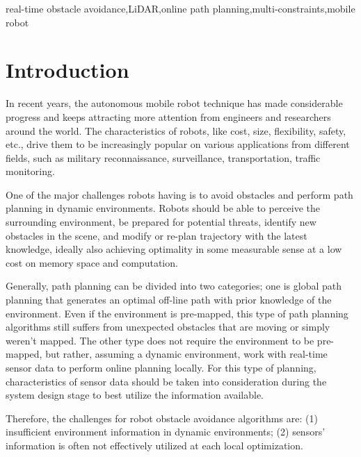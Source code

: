\documentclass{iosart2c}
\begin{document}
\begin{frontmatter}
\begin{keyword}
real-time obstacle avoidance\sep LiDAR\sep online path planning\sep multi-constraints\sep mobile robot
\end{keyword}

\end{frontmatter}



\section{Introduction}\label{s1}
In recent years, the autonomous mobile robot technique has made considerable progress and keeps attracting more attention from engineers and researchers around the world. The characteristics of robots, like cost, size, flexibility, safety, etc., drive them to be increasingly popular on various applications from different fields, such as military reconnaissance, surveillance, transportation, traffic monitoring\cite{1,2}. 

One of the major challenges robots having is to avoid obstacles and perform path planning in dynamic environments. Robots should be able to perceive the surrounding environment, be prepared for potential threats, identify new obstacles in the scene, and modify or re-plan trajectory with the latest knowledge, ideally also achieving optimality in some measurable sense at a low cost on memory space and computation.

Generally, path planning can be divided into two categories; one is global path planning that generates an optimal off-line path with prior knowledge of the environment. Even if the environment is pre-mapped, this type of path planning algorithms still suffers from unexpected obstacles that are moving or simply weren’t mapped. The other type does not require the environment to be pre-mapped, but rather, assuming a dynamic environment, work with real-time sensor data to perform online planning locally\cite{3}. For this type of planning, characteristics of sensor data should be taken into consideration during the system design stage to best utilize the information available.

Therefore, the challenges for robot obstacle avoidance algorithms are: (1) insufficient environment information in dynamic environments; (2) sensors' information is often not effectively utilized at each local optimization.
\end{document}
